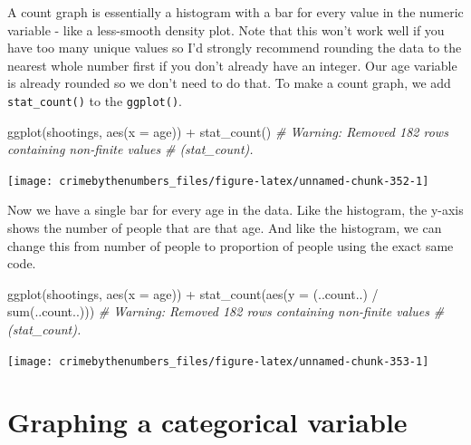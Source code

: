\documentclass[
  a4paper,
]{krantz}
\makeatletter
\newenvironment{Shaded}{\begin{snugshade}}{\end{snugshade}}
\newcommand{\AttributeTok}[1]{\textcolor[rgb]{0.61,0.61,0.61}{#1}}
\newcommand{\CommentTok}[1]{\textcolor[rgb]{0.37,0.37,0.37}{\textit{#1}}}
\newcommand{\FunctionTok}[1]{\textcolor[rgb]{0,0,0}{#1}}
\newcommand{\NormalTok}[1]{#1}
\newcommand{\SpecialCharTok}[1]{\textcolor[rgb]{0,0,0}{#1}}
\newenvironment{kframe}{%
\medskip{}
\setlength{\fboxsep}{.8em}
 \def\at@end@of@kframe{}%
 \ifinner\ifhmode%
  \def\at@end@of@kframe{\end{minipage}}%
  \begin{minipage}{\columnwidth}%
 \fi\fi%
 \def\FrameCommand##1{\hskip\@totalleftmargin \hskip-\fboxsep
 \colorbox{shadecolor}{##1}\hskip-\fboxsep
     \hskip-\linewidth \hskip-\@totalleftmargin \hskip\columnwidth}%
 \MakeFramed {\advance\hsize-\width
   \@totalleftmargin\z@ \linewidth\hsize
   \@setminipage}}%
 {\par\unskip\endMakeFramed%
 \at@end@of@kframe}
\renewenvironment{Shaded}{\begin{kframe}}{\end{kframe}}
\makeatother
\begin{document}
A count graph is essentially a histogram with a bar for
every value in the numeric variable - like a less-smooth
density plot. Note that this won't work well if you have too
many unique values so I'd strongly recommend rounding the
data to the nearest whole number first if you don't already
have an integer. Our age variable is already rounded so we
don't need to do that. To make a count graph, we add
\texttt{stat\_count()} to the \texttt{ggplot()}.

\begin{Shaded}
\begin{Highlighting}[]
\FunctionTok{ggplot}\NormalTok{(shootings, }\FunctionTok{aes}\NormalTok{(}\AttributeTok{x =}\NormalTok{ age)) }\SpecialCharTok{+}
  \FunctionTok{stat\_count}\NormalTok{()}
\CommentTok{\# Warning: Removed 182 rows containing non{-}finite values}
\CommentTok{\# (stat\_count).}
\end{Highlighting}
\end{Shaded}

\begin{center}\texttt{[image: crimebythenumbers\_files/figure-latex/unnamed-chunk-352-1]} \end{center}

Now we have a single bar for every age in the data. Like the
histogram, the y-axis shows the number of people that are
that age. And like the histogram, we can change this from
number of people to proportion of people using the exact
same code.

\begin{Shaded}
\begin{Highlighting}[]
\FunctionTok{ggplot}\NormalTok{(shootings, }\FunctionTok{aes}\NormalTok{(}\AttributeTok{x =}\NormalTok{ age)) }\SpecialCharTok{+}
  \FunctionTok{stat\_count}\NormalTok{(}\FunctionTok{aes}\NormalTok{(}\AttributeTok{y =}\NormalTok{ (..count..) }\SpecialCharTok{/} \FunctionTok{sum}\NormalTok{(..count..)))}
\CommentTok{\# Warning: Removed 182 rows containing non{-}finite values}
\CommentTok{\# (stat\_count).}
\end{Highlighting}
\end{Shaded}

\begin{center}\texttt{[image: crimebythenumbers\_files/figure-latex/unnamed-chunk-353-1]} \end{center}

\hypertarget{graphing-a-categorical-variable}{%
\section{Graphing a categorical
variable}\label{graphing-a-categorical-variable}}
\end{document}
